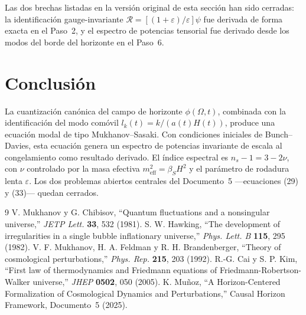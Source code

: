 \documentclass[12pt,a4paper]{article}
\begin{document}
Las dos brechas listadas en la versión original de esta sección han sido cerradas: la identificación gauge-invariante $\mathcal{R} = [(1+\varepsilon)/\varepsilon]\psi$ fue derivada de forma exacta en el Paso~2, y el espectro de potencias tensorial fue derivado desde los modos del borde del horizonte en el Paso~6.

\section{Conclusión}

La cuantización canónica del campo de horizonte $\phi(\Omega, t)$, combinada con la identificación del modo comóvil $l_k(t) = k/(a(t)H(t))$, produce una ecuación modal de tipo Mukhanov--Sasaki. Con condiciones iniciales de Bunch--Davies, esta ecuación genera un espectro de potencias invariante de escala al congelamiento como resultado derivado. El índice espectral es $n_s - 1 = 3 - 2\nu$, con $\nu$ controlado por la masa efectiva $m_\text{eff}^2 = \beta_S H^2$ y el parámetro de rodadura lenta $\varepsilon$. Los dos problemas abiertos centrales del Documento~5 ---ecuaciones (29) y (33)--- quedan cerrados.

\begin{thebibliography}{9}
 V. Mukhanov y G. Chibisov, ``Quantum fluctuations and a nonsingular universe,'' \textit{JETP Lett.} \textbf{33}, 532 (1981).
 S. W. Hawking, ``The development of irregularities in a single bubble inflationary universe,'' \textit{Phys. Lett. B} \textbf{115}, 295 (1982).
 V. F. Mukhanov, H. A. Feldman y R. H. Brandenberger, ``Theory of cosmological perturbations,'' \textit{Phys. Rep.} \textbf{215}, 203 (1992).
 R.-G. Cai y S. P. Kim, ``First law of thermodynamics and Friedmann equations of Friedmann-Robertson-Walker universe,'' \textit{JHEP} \textbf{0502}, 050 (2005).
 K. Mu\~noz, ``A Horizon-Centered Formalization of Cosmological Dynamics and Perturbations,'' Causal Horizon Framework, Documento~5 (2025).
\end{thebibliography}
\end{document}
